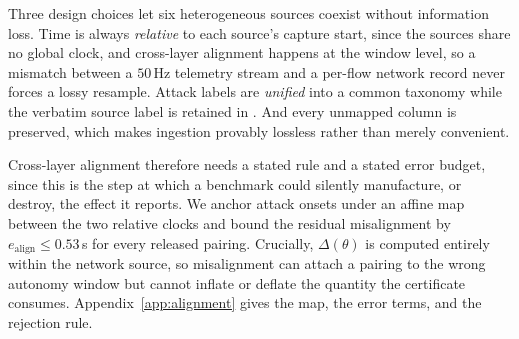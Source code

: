 Three design choices let six heterogeneous sources coexist without information
loss. Time is always \emph{relative} to each source's capture start, since the
sources share no global clock, and cross-layer alignment happens at the window
level, so a mismatch between a $50$\,Hz telemetry stream and a per-flow network
record never forces a lossy resample. Attack labels are \emph{unified} into a
common taxonomy while the verbatim source label is retained in
. And every unmapped column is preserved, which makes
ingestion provably lossless rather than merely convenient.

Cross-layer alignment therefore needs a stated rule and a stated error budget,
since this is the step at which a benchmark could silently manufacture, or
destroy, the effect it reports. We anchor attack onsets under an affine map
between the two relative clocks and bound the residual misalignment by
$e_{\mathrm{align}}\le0.53$\,s for every released pairing. Crucially,
$\Delta(\theta)$ is computed entirely within the network source, so misalignment
can attach a pairing to the wrong autonomy window but cannot inflate or deflate
the quantity the certificate consumes. Appendix~\ref{app:alignment} gives the
map, the error terms, and the rejection rule.

